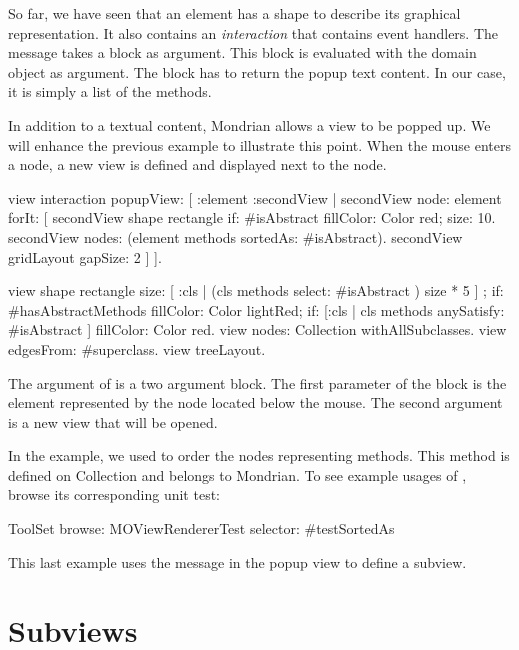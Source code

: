 \documentclass[a4paper,10pt,twoside]{book}
\begin{document}
So far, we have seen that an element has a shape to describe its graphical representation. It also contains an \emph{interaction} that contains event handlers. The message  takes a block as argument. This block is evaluated with the domain object as argument. The block has to return the popup text content. In our case, it is simply a list of the methods.

In addition to a textual content, Mondrian allows a view to be popped up. We will enhance the previous example to illustrate this point. When the mouse enters a node, a new view is defined and displayed next to the node. %

\begin{code}{}
view interaction popupView: [ :element :secondView | 
	secondView node: element forIt: [
	  secondView shape rectangle 
	    if: #isAbstract fillColor: Color red;
	    size: 10.  
	  secondView nodes: (element methods sortedAs: #isAbstract).
	  secondView gridLayout gapSize: 2 
	] ].

view shape rectangle
	size: [ :cls | (cls methods select:  #isAbstract ) size * 5 ] ;
	if: #hasAbstractMethods fillColor: Color lightRed;
	if: [:cls | cls methods anySatisfy: #isAbstract ] fillColor: Color red.
view nodes: Collection withAllSubclasses.
view edgesFrom: #superclass.
view treeLayout.
\end{code}

The argument of  is a two argument block. The first parameter of the block is the element represented by the node located below the mouse. The second argument is a new view that will be opened.

In the example, we used  to order the nodes representing methods. This method is defined on Collection and belongs to Mondrian. To see example usages of , browse its corresponding unit test:
\begin{code}{}
ToolSet browse: MOViewRendererTest selector: #testSortedAs 
\end{code}

This last example uses the message  in the popup view to define a subview.


\section{Subviews}
\end{document}
